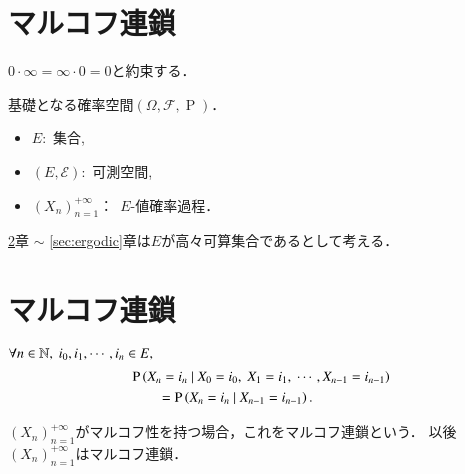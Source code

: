 \section{マルコフ連鎖}
	\begin{rem}
		$0 \cdot \infty = \infty \cdot 0 = 0$と約束する．
	\end{rem}
	基礎となる確率空間$(\Omega, \mathcal{F}, \operatorname{P})$．
	\begin{itemize}
		\item $E$:\ 集合,
		\item $(E, \mathcal{E})$:\ 可測空間,
		\item $(X_n)_{n=1}^{+\infty}$：\ $E$-値確率過程．
	\end{itemize}
	\begin{rem}
		\ref{sec:first}章 $\sim$ \ref{sec:ergodic}章は$E$が高々可算集合であるとして考える．
	\end{rem}
	
\section{マルコフ連鎖}
	\label{sec:first}
	\begin{dfn}[マルコフ性]
		$\forall n \in \mathbb{N},\ i_0, i_1, \cdots,i_n \in E,$
		\begin{align}
			 &\operatorname{P} \left( X_n = i_n \ \middle|\ X_0 = i_0,\ X_1 = i_1,\ \cdots, X_{n-1} = i_{n-1} \right) \\
			 &\qquad= \operatorname{P} \left( X_n = i_n \ \middle|\ X_{n-1} = i_{n-1} \right).
		\end{align}
	\end{dfn}
	$(X_n)_{n=1}^{+\infty}$がマルコフ性を持つ場合，これをマルコフ連鎖という．
	以後$(X_n)_{n=1}^{+\infty}$はマルコフ連鎖．

